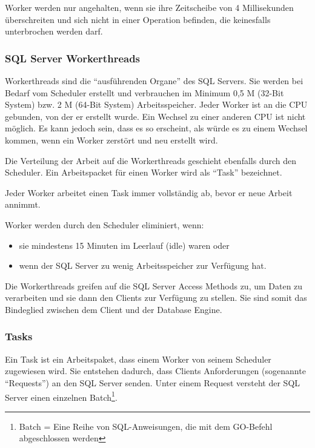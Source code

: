           \begin{merke}
            Worker werden nur angehalten, wenn sie ihre Zeitscheibe von
            4 Millisekunden überschreiten und sich nicht in einer
            Operation befinden, die keinesfalls unterbrochen werden darf.
          \end{merke}
\clearpage
        \subsubsection{SQL Server Workerthreads}
          Workerthreads sind die \enquote{ausführenden Organe} des SQL Servers.
          Sie werden bei Bedarf vom Scheduler erstellt und verbrauchen im Minimum
          0,5 M (32-Bit System) bzw. 2 M (64-Bit System) Arbeitsspeicher. Jeder
          Worker ist an die CPU gebunden, von der er erstellt wurde. Ein
          Wechsel zu einer anderen CPU ist nicht möglich. Es kann jedoch sein,
          dass es so erscheint, als würde es zu einem Wechsel kommen, wenn ein
          Worker zerstört und neu erstellt wird.
          
          Die Verteilung der Arbeit auf die Workerthreads geschieht ebenfalls
          durch den Scheduler. Ein Arbeitspacket für einen Worker wird als
          \enquote{Task} bezeichnet. 
          \begin{merke}
            Jeder Worker arbeitet einen Task immer vollständig ab, bevor er neue
            Arbeit annimmt.
          \end{merke}
          Worker werden durch den Scheduler eliminiert, wenn:
          \begin{itemize}
            \item sie mindestens 15 Minuten im Leerlauf (idle) waren oder
            \item wenn der SQL Server zu wenig Arbeitsspeicher zur Verfügung hat.
          \end{itemize}
          Die Workerthreads greifen auf die SQL Server Access Methods zu, um Daten
          zu verarbeiten und sie dann den Clients zur Verfügung zu stellen. Sie
          sind somit das Bindeglied zwischen dem Client und der Database Engine.
        \subsubsection{Tasks}
          Ein Task ist ein Arbeitspaket, dass einem Worker von seinem Scheduler
          zugewiesen wird. Sie entstehen dadurch, dass Clients
          Anforderungen (sogenannte \enquote{Requests}) an den SQL
          Server senden. Unter einem Request versteht der SQL Server
          einen einzelnen Batch\footnote{Batch = Eine Reihe von
          SQL-Anweisungen, die mit dem GO-Befehl abgeschlossen werden}.        
